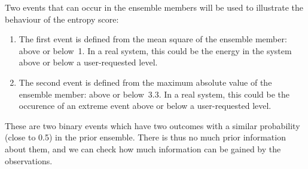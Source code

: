 \documentclass[11pt]{article}
\begin{document}
Two events that can occur in the ensemble members
will be used to illustrate the behaviour of the entropy score:

\begin{enumerate}
\item The first event is defined from the mean square of the ensemble member: above or below~1.
In a real system, this could be the energy in the system above or below a user-requested level.
\item The second event is defined from the maximum absolute value of the ensemble member: above or below~3.3.
In a real system, this could be the occurence of an extreme event above or below a user-requested level.
\end{enumerate}

\noindent
These are two binary events which have two outcomes
with a similar probability (close to 0.5) in the prior ensemble.
There is thus no much prior information about them,
and we can check how much information
can be gained by the observations.
\end{document}
